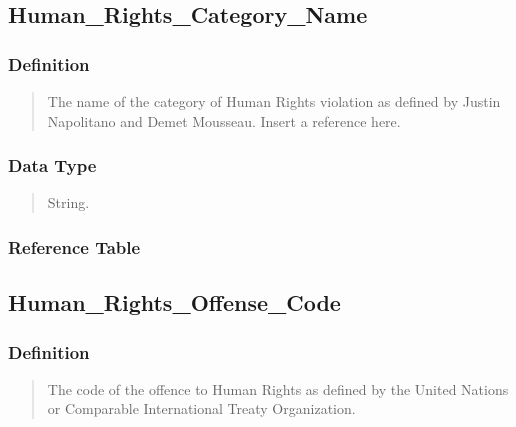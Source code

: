 \documentclass[letterpaper,10pt,english]{sphinxmanual}
\begin{document}
\subsection{Human\_Rights\_Category\_Name}
\label{\detokenize{database_schema:human-rights-category-name}}

\subsubsection{Definition}
\label{\detokenize{database_schema:id70}}\begin{quote}

\sphinxAtStartPar
The name of the category of Human Rights violation as defined by Justin Napolitano and Demet Mousseau. Insert a reference here.
\end{quote}


\subsubsection{Data Type}
\label{\detokenize{database_schema:id71}}\begin{quote}

\sphinxAtStartPar
String.
\end{quote}


\subsubsection{Reference Table}
\label{\detokenize{database_schema:id72}}\begin{quote}

\sphinxAtStartPar
{\hyperref[\detokenize{database_schema:human-rights-category-table}]{}}
\end{quote}


\subsection{Human\_Rights\_Offense\_Code}
\label{\detokenize{database_schema:human-rights-offense-code}}

\subsubsection{Definition}
\label{\detokenize{database_schema:id73}}\begin{quote}

\sphinxAtStartPar
The code of the offence to Human Rights as defined by the United Nations or Comparable International Treaty Organization.
\end{quote}
\end{document}
